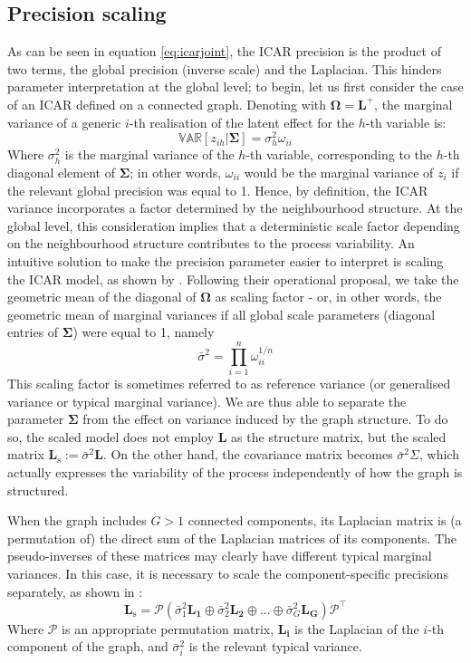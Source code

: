 \documentclass[openany, 11pt, oneside]{book}
\begin{document}
\subsection{Precision scaling} \label{subsection:scaling}

As can be seen in equation \ref{eq:icarjoint}, the ICAR precision is the product of two terms, the global precision (inverse scale) and the Laplacian. This hinders parameter interpretation at the global level; to begin, let us first consider the case of an ICAR defined on a connected graph. Denoting with $\boldsymbol{\Omega}  = \boldsymbol{L}^{+}$, the marginal variance of a generic $i$-th realisation of the latent effect for the $h$-th variable is: 
%
$$
\mathbb{VAR}[z_{ih} \vert \boldsymbol{\Sigma}] = \sigma_{h}^2 \omega_{ii}
$$
Where $\sigma_h^2$ is the marginal variance of the $h$-th variable, corresponding to the $h$-th diagonal element of $\boldsymbol{\Sigma}$; in other words, $\omega_{ii}$ would be the marginal variance of $z_i$ if the relevant global precision was equal to 1.
%
Hence, by definition, the ICAR variance incorporates a factor determined by the neighbourhood structure. At the global level, this consideration implies that a deterministic scale factor depending on the neighbourhood structure contributes to the process variability. An intuitive solution to make the precision parameter easier to interpret is scaling the ICAR model, as shown by \cite{Sorbye}. Following their operational proposal, we take the geometric mean of the diagonal of $\boldsymbol{\Omega}$ as scaling factor - or, in other words, the geometric mean of marginal variances if all global scale parameters (diagonal entries of $\boldsymbol{\Sigma}$) were equal to 1, namely
$$
\bar{\sigma}^{2} = \prod_{i=1}^{n} \omega_{ii}^{1/n}
$$
This scaling factor is sometimes referred to as reference variance (or generalised variance or typical marginal variance). We are thus able to separate the parameter $\boldsymbol{\Sigma}$ from the effect on variance induced by the graph structure. To do so, the scaled model does not employ $\boldsymbol{L}$ as the structure matrix, but the scaled matrix $\boldsymbol{L}_\mathrm{s} := \bar{\sigma}^2 \boldsymbol{L} $. On the other hand, the covariance matrix becomes $\bar{\sigma}^2 \Sigma$, which actually expresses the variability of the process independently of how the graph is structured. 

When the graph includes $G >1$ connected components, its Laplacian matrix is (a permutation of) the direct sum of the Laplacian matrices of its components. The pseudo-inverses of these matrices may clearly have different typical marginal variances. In this case, it is necessary to scale the component-specific precisions separately, as shown in \cite{Freni2018}:
$$
\boldsymbol{L}_\mathrm{s} = \mathcal{P} \left( \bar{\sigma}_1^2 \boldsymbol{L_1} \oplus \bar{\sigma}_2^2 \boldsymbol{L_2}
\oplus ... \oplus \bar{\sigma}_G^2 \boldsymbol{L_G} \right) \mathcal{P^{\top}}
$$
Where $\mathcal{P}$ is an appropriate permutation matrix, $\boldsymbol{L_i}$ is the Laplacian of the $i$-th component of the graph, and $\bar{\sigma}_i^2$ is the relevant typical variance.
\end{document}
